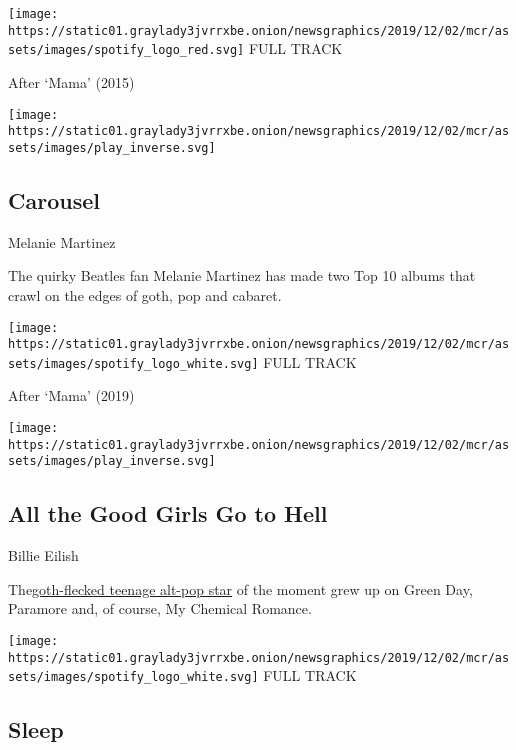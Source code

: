 \href{https://open.spotify.com/track/0Zh3tKIphLOvQux4dA6PFZ?si=FyNG2SLhQXajngfFY1Rhzg}{}

\texttt{[image: https://static01.graylady3jvrrxbe.onion/newsgraphics/2019/12/02/mcr/assets/images/spotify\_logo\_red.svg]}
FULL TRACK

After `Mama' (2015)

\texttt{[image: https://static01.graylady3jvrrxbe.onion/newsgraphics/2019/12/02/mcr/assets/images/play\_inverse.svg]}

\hypertarget{carousel}{%
\subsection{Carousel}\label{carousel}}

Melanie Martinez

The quirky Beatles fan Melanie Martinez has made two Top 10 albums that
crawl on the edges of goth, pop and cabaret.

\href{https://open.spotify.com/track/5nHTLEJ10zaqdnKqLriah4?si=x_E8tvW0RdC7BaOUuaf7Bg}{}

\texttt{[image: https://static01.graylady3jvrrxbe.onion/newsgraphics/2019/12/02/mcr/assets/images/spotify\_logo\_white.svg]}
FULL TRACK

After `Mama' (2019)

\texttt{[image: https://static01.graylady3jvrrxbe.onion/newsgraphics/2019/12/02/mcr/assets/images/play\_inverse.svg]}

\hypertarget{all-the-good-girls-go-to-hell}{%
\subsection{All the Good Girls Go to
Hell}\label{all-the-good-girls-go-to-hell}}

Billie Eilish

The\href{https://www.nytimes3xbfgragh.onion/2019/03/28/arts/music/billie-eilish-debut-album.html}{}\href{https://www.nytimes3xbfgragh.onion/2019/03/28/arts/music/billie-eilish-debut-album.html}{goth-flecked
teenage alt-pop star} of the moment grew up on Green Day, Paramore and,
of course, My Chemical Romance.

\href{https://open.spotify.com/track/6IRdLKIyS4p7XNiP8r6rsx?si=XrCiLe7WQwqx05ok4fNkyA}{}

\texttt{[image: https://static01.graylady3jvrrxbe.onion/newsgraphics/2019/12/02/mcr/assets/images/spotify\_logo\_white.svg]}
FULL TRACK

\hypertarget{sleep}{%
\subsection{Sleep}\label{sleep}}

